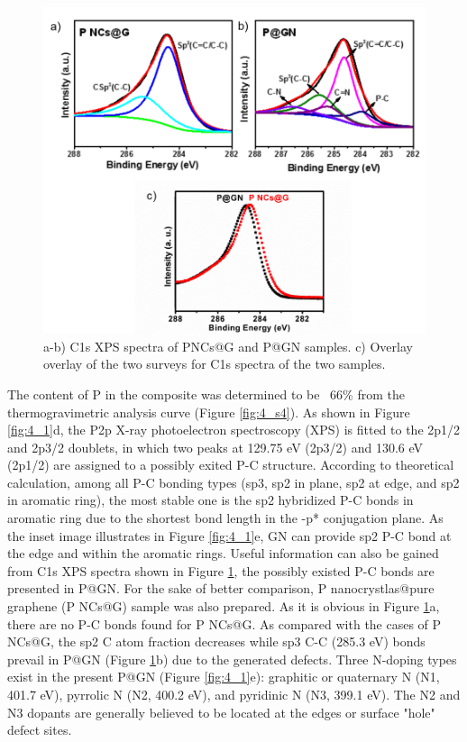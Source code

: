 \begin{figure}  
\centering
\includegraphics[width=320pt]{figures/figure4_s5}
\caption[C1s XPS spectra comparison]
{a-b) C1s XPS spectra of PNCs@G and P@GN samples. c) Overlay overlay of the two surveys for C1s spectra of the two samples. 
\label{fig:4_s5}}
\end{figure}

The content of P in the composite was determined to be ~66\% from the thermogravimetric analysis curve (Figure \ref{fig:4_s4}). As shown in Figure \ref{fig:4_1}d, the P2p X-ray photoelectron spectroscopy (XPS) is fitted to the 2p1/2 and 2p3/2 doublets, in which two peaks at 129.75 eV (2p3/2) and 130.6 eV (2p1/2) are assigned to a possibly exited P-C structure.\cite{Jiao2014b,Niu2014b,Zhang2013b} According to theoretical calculation,\cite{Sun2014b,Claeyssens2009b} among all P-C bonding types (sp3, sp2 in plane, sp2 at edge, and sp2 in aromatic ring), the most stable one is the sp2 hybridized P-C bonds in aromatic ring due to the shortest bond length in the \pi-p* conjugation plane. As the inset image illustrates in Figure \ref{fig:4_1}e, GN can provide sp2 P-C bond at the edge and within the aromatic rings. Useful information can also be gained from C1s XPS spectra shown in Figure \ref{fig:4_s5}, the possibly existed P-C bonds are presented in P@GN. For the sake of better comparison, P nanocrystlas@pure graphene (P NCs@G) sample was also prepared. As it is obvious in Figure \ref{fig:4_s5}a, there are no P-C bonds found for P NCs@G. As compared with the cases of P NCs@G, the sp2 C atom fraction decreases while sp3 C-C (285.3 eV) bonds prevail in P@GN (Figure \ref{fig:4_s5}b) due to the generated defects. Three N-doping types exist in the present P@GN (Figure \ref{fig:4_1}e): graphitic or quaternary N (N1, 401.7 eV), pyrrolic N (N2, 400.2 eV), and pyridinic N (N3, 399.1 eV).\cite{Roth1947b,Wang2012e,Wang2014f,Wang2013i} The N2 and N3 dopants are generally believed to be located at the edges or surface "hole" defect sites.\\

